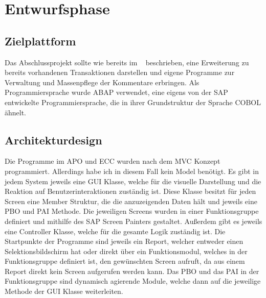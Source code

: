 \section{Entwurfsphase} 
\label{sec:Entwurfsphase}

\subsection{Zielplattform}
\label{sec:Zielplattform}
Das Abschlussprojekt sollte wie bereits im ~ beschrieben, eine Erweiterung zu bereits vorhandenen Transaktionen darstellen und eigene Programme zur Verwaltung und Massenpflege der Kommentare erbringen. Als Programmiersprache wurde \ac{ABAP} verwendet, eine eigens von der SAP entwickelte Programmiersprache, die in ihrer Grundstruktur der Sprache COBOL ähnelt.

\subsection{Architekturdesign}
\label{sec:Architekturdesign}
Die Programme im \ac{APO} und \ac{ECC} wurden nach dem \ac{MVC} Konzept programmiert. Allerdings habe ich in diesem Fall kein Model benötigt. Es gibt in jedem System jeweils eine \ac{GUI} Klasse, welche für die visuelle Darstellung und die Reaktion auf Benutzerinteraktionen zuständig ist. Diese Klasse besitzt für jeden Screen eine Member Struktur, die die anzuzeigenden Daten hält und jeweils eine \ac{PBO} und \ac{PAI} Methode. Die jeweiligen Screens wurden in einer Funktionsgruppe definiert und mithilfe des SAP Screen Painters gestaltet. Außerdem gibt es jeweils eine Controller Klasse, welche für die gesamte Logik zuständig ist. Die Startpunkte der Programme sind jeweils ein Report, welcher entweder einen Selektionsbildschirm hat oder direkt über ein Funktionsmodul, welches in der Funktionsgruppe definiert ist, den gewünschten Screen aufruft, da aus einem Report direkt kein Screen aufgerufen werden kann. Das \ac{PBO} und das \ac{PAI} in der Funktionsgruppe sind dynamisch agierende Module, welche dann auf die jeweilige Methode der \ac{GUI} Klasse weiterleiten.

